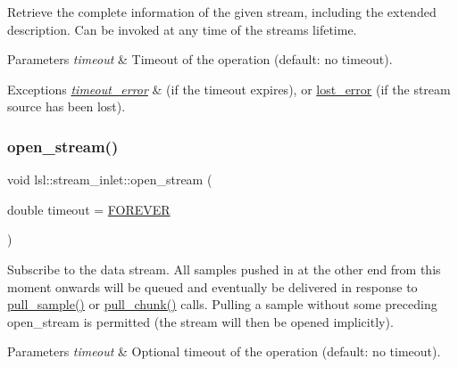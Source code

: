 Retrieve the complete information of the given stream, including the extended description. Can be invoked at any time of the stream\textquotesingle{}s lifetime. 
\begin{DoxyParams}{Parameters}
{\em timeout} & Timeout of the operation (default\+: no timeout). \\
\hline
\end{DoxyParams}

\begin{DoxyExceptions}{Exceptions}
{\em \hyperlink{classlsl_1_1timeout__error}{timeout\+\_\+error}} & (if the timeout expires), or \hyperlink{classlsl_1_1lost__error}{lost\+\_\+error} (if the stream source has been lost). \\
\hline
\end{DoxyExceptions}
\mbox{\label{classlsl_1_1stream__inlet_ad84029ed0662d755b0544c7652348718}} 
\subsubsection{\texorpdfstring{open\+\_\+stream()}{open\_stream()}}
{\footnotesize\ttfamily void lsl\+::stream\+\_\+inlet\+::open\+\_\+stream (\begin{DoxyParamCaption}\item[{double}]{timeout = {\ttfamily \hyperlink{namespacelsl_a74cfbc9077aca21295117217249721ed}{F\+O\+R\+E\+V\+ER}} }\end{DoxyParamCaption})\hspace{0.3cm}{\ttfamily [inline]}}

Subscribe to the data stream. All samples pushed in at the other end from this moment onwards will be queued and eventually be delivered in response to \hyperlink{classlsl_1_1stream__inlet_a58dc91be6ec0d1b83024a169ad0c292b}{pull\+\_\+sample()} or \hyperlink{classlsl_1_1stream__inlet_a558f53812f5dc3c19b2cbe0026a61f6a}{pull\+\_\+chunk()} calls. Pulling a sample without some preceding open\+\_\+stream is permitted (the stream will then be opened implicitly). 
\begin{DoxyParams}{Parameters}
{\em timeout} & Optional timeout of the operation (default\+: no timeout). \\
\hline
\end{DoxyParams}

